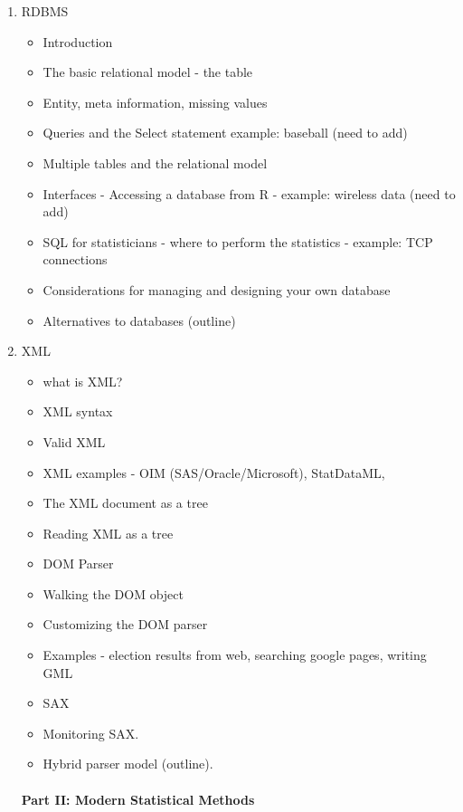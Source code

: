 \documentclass[11pt,timesroman]{article}
\begin{document}
\begin{enumerate}
\item{RDBMS}
        \begin{itemize}
        \item Introduction 
        \item The basic relational model - the table
        \item Entity, meta information, missing values
        \item Queries and the Select statement  example: baseball (need to add)
        \item Multiple tables and the relational model
        \item Interfaces - Accessing a database from R - example: wireless data (need to add)
        \item SQL for statisticians - where to perform the statistics - example: TCP connections
        \item Considerations for managing and designing your own database
        \item Alternatives to databases (outline)
        \end{itemize}


\item{XML}

        \begin{itemize}
        \item what is XML?
        \item XML syntax
        \item Valid XML 
        \item XML examples - OIM (SAS/Oracle/Microsoft), StatDataML, 
        \item The XML document as a tree
        \item Reading XML as a tree
        \item DOM Parser
        \item Walking the DOM object
        \item Customizing the DOM parser
        \item Examples - election results from web, searching google pages, writing GML 
        \item SAX
        \item Monitoring SAX.
        \item Hybrid parser model (outline). 
        \end{itemize}


\paragraph{Part II: Modern Statistical Methods}


\end{enumerate}
\end{document}
